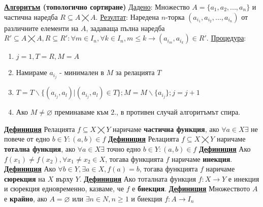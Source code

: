 \documentclass{article}
\begin{document}
\textbf{\underline{Алгоритъм} (топологично сортиране)} \newline\newline
\underline{Дадено}: Множество $A = \{a_1,a_2,...,a_n\}$ и частична наредба $R \subseteq A \bigtimes A$. \newline
\underline{Резултат}: Наредена $n$-торка $(a_{i_1},a_{i_2},...,a_{i_n})$ от различните елементи на $A$, задаваща пълна наредба
$R' \subseteq A \bigtimes A, R \subseteq R': \forall m \in I_n, \forall k \in I_n, m \le k \rightarrow (a_{i_m}, a_{i_k}) \in R'$. \newline
\underline{Процедура}: \begin{enumerate}
    \item $j = 1, T = R, M = A$
    \item Намираме $a_{i_j}$ - минимален в $M$ за релацията $T$
    \item $T = T \backslash \{(a_{i_j}, a_l) | (a_{i_j}, a_l) \in T\}; M = M \backslash \{a_{i_j}\}; j = j + 1$
    \item Ако $M \neq \varnothing$ преминаваме към $2.$, в противен случай алгоритъмът спира.
\end{enumerate}
\textbf{\underline{Дефиниция}}
Релацията $f \subseteq X \bigtimes Y$ наричаме \textbf{частична функция}, ако $\forall a \in X \exists$ не повече от 
едно $b \in Y : (a, b) \in f$ \newline\newline
\textbf{\underline{Дефиниция}}
Релацията $f \subseteq X \bigtimes Y$ наричаме \textbf{тотална функция}, ако $\forall a \in X \exists$ точно
едно $b \in Y : (a, b) \in f$ \newline\newline
\textbf{\underline{Дефиниция}}
Ако $f(x_1) \neq f(x_2), \forall x_1 \neq x_2 \in X$, тогава функцията $f$ наричаме \textbf{инекция}. \newline\newline
\textbf{\underline{Дефиниция}}
Ако $\forall b \in Y, \exists a \in X, f(a) = b$, тогава функцията $f$ наричаме \textbf{сюрекция} на $X$ върху $Y$. \newline\newline
\textbf{\underline{Дефиниция}}
Ако тоталната функция $f : X \rightarrow Y$ е инекция и сюрекция едновременно, казваме, че $f$ е \textbf{биекция}. \newline\newline
\textbf{\underline{Дефиниция}}
Множеството $A$ е \textbf{крайно}, ако $A = \varnothing$ или $\exists n \in N, n \ge 1$ и биекция $f : A \rightarrow I_n$
\end{document}
